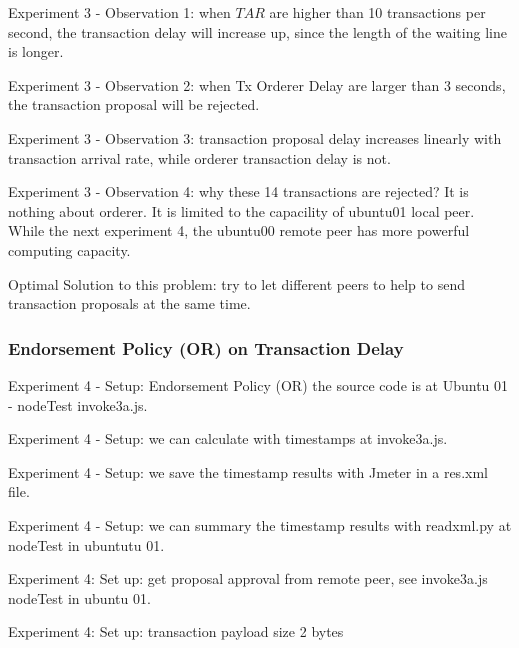 \documentclass[10pt,journal,compsoc, twoside]{IEEEtran}
\begin{document}
Experiment 3 - Observation 1: when $TAR$ are higher than 10 transactions per second, the transaction delay will increase up, since the length of the waiting line is longer.

Experiment 3 - Observation 2: when Tx Orderer Delay are larger than 3 seconds, the transaction proposal will be rejected.

Experiment 3 - Observation 3: transaction proposal delay increases linearly with transaction arrival rate, while orderer transaction delay is not.


Experiment 3 - Observation 4: why these 14 transactions are rejected? It is nothing about orderer. It is limited to the capacility of ubuntu01 local peer. While the next experiment 4, the ubuntu00 remote peer has more powerful computing capacity.

Optimal Solution to this problem: try to let different peers to help to send transaction proposals at the same time. 



\subsubsection{Endorsement Policy (OR) on Transaction Delay}

Experiment 4 - Setup: Endorsement Policy (OR) the source code is at Ubuntu 01 - nodeTest invoke3a.js.

Experiment 4 - Setup: we can calculate with timestamps at invoke3a.js.

Experiment 4 - Setup: we save the timestamp results with Jmeter in a res.xml file.

Experiment 4 - Setup: we can summary the timestamp results with readxml.py at nodeTest in ubuntutu 01.

Experiment 4: Set up: get proposal approval from remote peer, see invoke3a.js nodeTest in ubuntu 01.

Experiment 4: Set up: transaction payload size 2 bytes
\end{document}
